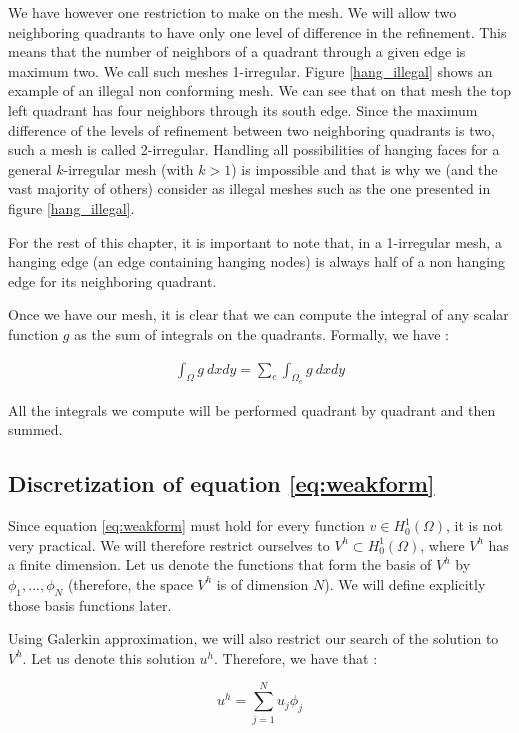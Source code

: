 We have however one restriction to make on the mesh. We will allow two neighboring quadrants to have only one level of difference in the refinement. This means that the number of neighbors of a quadrant through a given edge is maximum two. We call such meshes 1-irregular. Figure \ref{hang_illegal} shows an example of an illegal non conforming mesh. We can see that on that mesh the top left quadrant has four neighbors through its south edge. Since the maximum difference of the levels of refinement between two neighboring quadrants is two, such a mesh is called 2-irregular.  Handling all possibilities of hanging faces for a general $k$-irregular mesh (with $k>1$) is impossible and that is why we (and the vast majority of others) consider as illegal meshes such as the one presented in figure \ref{hang_illegal}.

For the rest of this chapter, it is important to note that, in a 1-irregular mesh, a hanging edge (an edge containing hanging nodes) is always half of a non hanging edge for its neighboring quadrant.

Once we have our mesh, it is clear that we can compute the integral of any scalar function $g$ as the sum of integrals on the quadrants. Formally, we have :  

\begin{align}
\int_\Omega g\:dxdy = \sum_e \int_{\Omega_e} g\:dxdy \label{eq:int}
\end{align}

All the integrals we compute will be performed quadrant by quadrant and then summed. 

\subsection{Discretization of equation \ref{eq:weakform}}

Since equation \ref{eq:weakform} must hold for every function $v \in H_0^1(\Omega)$, it is not very practical. We will therefore restrict ourselves to $V^h \subset H_0^1(\Omega)$, where $V^h$ has a finite dimension. Let us denote the functions that form the basis of $V^h$ by $\phi_1,..., \phi_N$ (therefore, the space $V^h$ is of dimension $N$). We will define explicitly those basis functions later. 

Using Galerkin approximation, we will also restrict our search of the solution to $V^h$. Let us denote this solution $u^h$. Therefore, we have that : 

$$u^h = \sum_{j=1}^N u_j \phi_j $$

